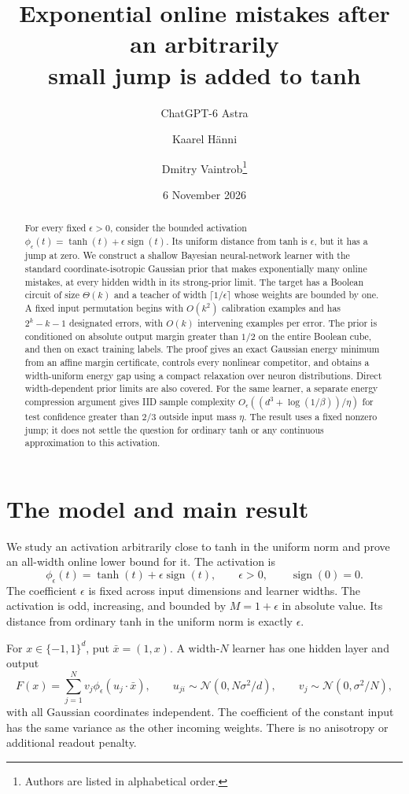 \documentclass[11pt]{article}
\title{Exponential online mistakes after an arbitrarily\protect\\small jump is added to tanh}
\author{ChatGPT-6 Astra \and Kaarel H\"anni \and Dmitry Vaintrob\thanks{Authors are listed in alphabetical order.}}
\date{6 November 2026}
\newcommand{\sgn}{\operatorname{sign}}
\begin{document}
\maketitle

\begin{abstract}
For every fixed $\epsilon>0$, consider the bounded activation
$\phi_\epsilon(t)=\tanh(t)+\epsilon\sgn(t)$. Its uniform distance from
tanh is $\epsilon$, but it has a jump at zero. We construct a shallow
Bayesian neural-network learner with the standard coordinate-isotropic
Gaussian prior that makes exponentially many online mistakes, at every
hidden width in its strong-prior limit. The target has a Boolean circuit
of size $\Theta(k)$ and a teacher of width $\lceil1/\epsilon\rceil$
whose weights are bounded by one. A fixed input permutation begins with
$O(k^2)$ calibration examples and has $2^k-k-1$ designated errors, with
$O(k)$ intervening examples per error. The prior is conditioned on
absolute output margin greater than $1/2$ on the entire Boolean cube,
and then on exact training labels. The proof gives an exact Gaussian
energy minimum from an affine margin certificate, controls every
nonlinear competitor, and obtains a width-uniform energy gap using a
compact relaxation over neuron distributions. Direct width-dependent
prior limits are also covered. For the same learner, a separate energy
compression argument gives IID sample complexity
$O_\epsilon((d^3+\log(1/\beta))/\eta)$ for test confidence greater than
$2/3$ outside input mass $\eta$.
The result uses a fixed nonzero jump; it does not settle the question for
ordinary tanh or any continuous approximation to this activation.
\end{abstract}

\section{The model and main result}

We study an activation arbitrarily close to tanh in the uniform norm
and prove an all-width online lower bound for it. The activation is
\[
 \phi_\epsilon(t)=\tanh(t)+\epsilon\sgn(t),\qquad
 \epsilon>0,\qquad \sgn(0)=0.
\]
The coefficient $\epsilon$ is fixed across input dimensions and learner
widths. The activation is odd, increasing, and bounded by
$M=1+\epsilon$ in absolute value. Its distance from ordinary tanh in
the uniform norm is exactly $\epsilon$.

For $x\in\{-1,1\}^d$, put $\bar x=(1,x)$. A width-$N$ learner has one
hidden layer and output
\begin{equation}\label{eq:model}
 F(x)=\sum_{j=1}^N v_j\phi_\epsilon(u_j\cdot\bar x),\qquad
 u_{ji}\sim\mathcal N(0,N\sigma^2/d),\qquad
 v_j\sim\mathcal N(0,\sigma^2/N),
\end{equation}
with all Gaussian coordinates independent. The coefficient of the
constant input has the same variance as the other incoming weights.
There is no anisotropy or additional readout penalty.
\end{document}
